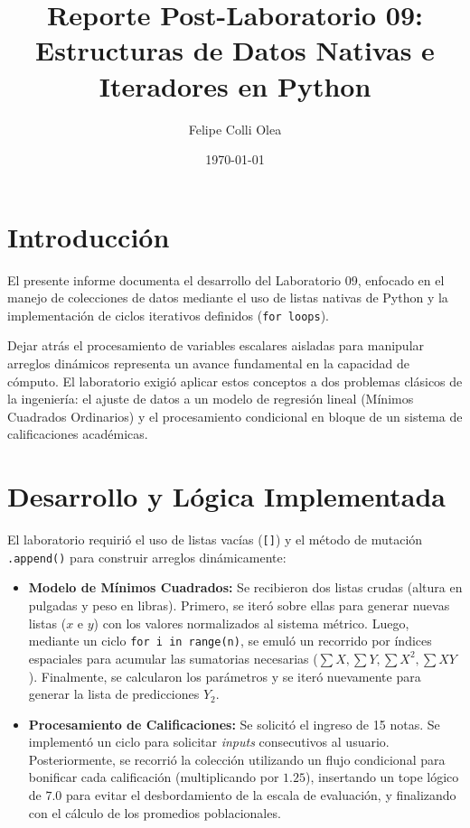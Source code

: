 \documentclass[11pt]{article}
\title{Reporte Post-Laboratorio 09: \\ \large{Estructuras de Datos Nativas e Iteradores en Python}}
\author{Felipe Colli Olea}
\date{\today}
\begin{document}
\maketitle
\thispagestyle{fancy}

\section{Introducción}

El presente informe documenta el desarrollo del Laboratorio 09, enfocado en el manejo de colecciones de datos mediante el uso de listas nativas de Python y la implementación de ciclos iterativos definidos (\texttt{for loops}).

Dejar atrás el procesamiento de variables escalares aisladas para manipular arreglos dinámicos representa un avance fundamental en la capacidad de cómputo. El laboratorio exigió aplicar estos conceptos a dos problemas clásicos de la ingeniería: el ajuste de datos a un modelo de regresión lineal (Mínimos Cuadrados Ordinarios) y el procesamiento condicional en bloque de un sistema de calificaciones académicas.

\section{Desarrollo y Lógica Implementada}

El laboratorio requirió el uso de listas vacías (\texttt{[]}) y el método de mutación \texttt{.append()} para construir arreglos dinámicamente:

\begin{itemize}
	\item \textbf{Modelo de Mínimos Cuadrados:} Se recibieron dos listas crudas (altura en pulgadas y peso en libras). Primero, se iteró sobre ellas para generar nuevas listas ($x$ e $y$) con los valores normalizados al sistema métrico. Luego, mediante un ciclo \texttt{for i in range(n)}, se emuló un recorrido por índices espaciales para acumular las sumatorias necesarias ($\sum X, \sum Y, \sum X^2, \sum XY$). Finalmente, se calcularon los parámetros y se iteró nuevamente para generar la lista de predicciones $Y_2$.

	\item \textbf{Procesamiento de Calificaciones:} Se solicitó el ingreso de 15 notas. Se implementó un ciclo para solicitar \textit{inputs} consecutivos al usuario. Posteriormente, se recorrió la colección utilizando un flujo condicional para bonificar cada calificación (multiplicando por $1.25$), insertando un tope lógico de $7.0$ para evitar el desbordamiento de la escala de evaluación, y finalizando con el cálculo de los promedios poblacionales.
\end{itemize}
\end{document}
